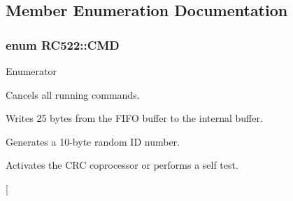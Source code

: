 \subsection{Member Enumeration Documentation}
\subsubsection[{\texorpdfstring{C\+MD}{CMD}}]{\setlength{\rightskip}{0pt plus 5cm}enum {\bf R\+C522\+::\+C\+MD}\hspace{0.3cm}{\ttfamily [strong]}}\hypertarget{class_r_c522_a8d2b2b09cb1978142f8c31b89049d968}{}\label{class_r_c522_a8d2b2b09cb1978142f8c31b89049d968}
\begin{Desc}
\item[Enumerator]\par
\begin{description}
\item[{\em 
Idle\hypertarget{class_r_c522_a8d2b2b09cb1978142f8c31b89049d968ae599161956d626eda4cb0a5ffb85271c}{}\label{class_r_c522_a8d2b2b09cb1978142f8c31b89049d968ae599161956d626eda4cb0a5ffb85271c}
}]Cancels all running commands. \item[{\em 
Mem\hypertarget{class_r_c522_a8d2b2b09cb1978142f8c31b89049d968adba5553473d129a7985fb532dc249ff4}{}\label{class_r_c522_a8d2b2b09cb1978142f8c31b89049d968adba5553473d129a7985fb532dc249ff4}
}]Writes 25 bytes from the F\+I\+FO buffer to the internal buffer. \item[{\em 
Rand\+Id\hypertarget{class_r_c522_a8d2b2b09cb1978142f8c31b89049d968a0f15bdc78a60f6b39a945102fb09e119}{}\label{class_r_c522_a8d2b2b09cb1978142f8c31b89049d968a0f15bdc78a60f6b39a945102fb09e119}
}]Generates a 10-\/byte random ID number. \item[{\em 
Calc\+C\+RC\hypertarget{class_r_c522_a8d2b2b09cb1978142f8c31b89049d968a3b8f7ce3dcfe31207ffafa7a9226411b}{}\label{class_r_c522_a8d2b2b09cb1978142f8c31b89049d968a3b8f7ce3dcfe31207ffafa7a9226411b}
}]Activates the C\+RC coprocessor or performs a self test. \item[{\em 
}
\end{description}
\end{Desc}
